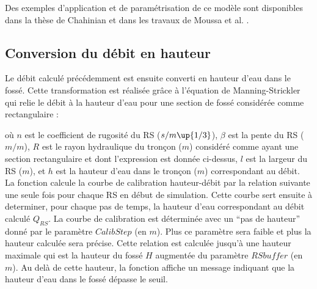 Des exemples d'application et de paramétrisation de ce modèle sont disponibles dans la thèse de Chahinian \cite{Chahinian2004} et dans les travaux de Moussa et al. \cite{Moussa2002}.


\subsection{Conversion du débit en hauteur}
Le débit calculé précédemment est ensuite converti en hauteur d'eau dans le fossé. Cette transformation est réalisée grâce à l'équation de Manning-Strickler qui relie le débit à la hauteur d'eau pour une section de fossé considérée comme rectangulaire :



où $n$ est le coefficient de rugosité du RS ($s/m\up{1/3}$), $\beta$ est la pente du RS ($m/m$), $R$ est le rayon hydraulique du tronçon ($m$) considéré comme ayant une section rectangulaire et dont l'expression est donnée ci-dessus, $l$ est la largeur du RS ($m$), et $h$ est la hauteur d'eau dans le tronçon ($m$) correspondant au débit.\\

La fonction calcule la courbe de calibration hauteur-débit par la relation suivante une seule fois pour chaque RS en début de simulation. Cette courbe sert ensuite à determiner, pour chaque pas de temps, la hauteur d'eau correspondant au débit calculé $Q_{RS}$. La courbe de calibration est déterminée avec un ``pas de hauteur'' donné par le paramètre $Calib Step$ (en $m$). Plus ce paramètre sera faible et plus la hauteur calculée sera précise. Cette relation est calculée jusqu'à une hauteur maximale qui est la hauteur du fossé $H$ augmentée du paramètre $RS buffer$ (en $m$). Au delà de cette hauteur, la fonction affiche un message indiquant que la hauteur d'eau dans le fossé dépasse le seuil.\\

